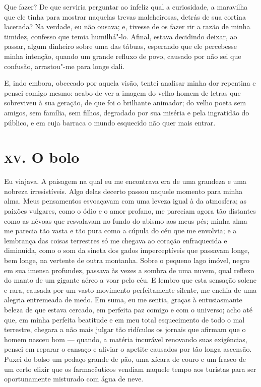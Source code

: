 Que fazer? De que serviria perguntar ao infeliz qual a curiosidade,
a maravilha que ele tinha para mostrar naquelas trevas malcheirosas,
detrás de sua cortina lacerada? Na verdade, eu não ousava; e, tivesse
de os fazer rir a razão de minha timidez, confesso que temia
humilhá"-lo. Afinal, estava decidindo deixar, ao passar, algum
dinheiro sobre uma das tábuas, esperando que ele percebesse minha
intenção, quando um grande refluxo de povo, causado por não sei que
confusão, arrastou"-me para longe dali.

E, indo embora, obcecado por aquela visão, tentei analisar minha
dor repentina e pensei comigo mesmo: acabo de ver a imagem do velho homem de
letras que sobreviveu à sua geração, de que foi o brilhante animador;
do velho poeta sem amigos, sem família, sem filhos, degradado por sua
miséria e pela ingratidão do público, e em cuja barraca o mundo esquecido
não quer mais entrar.

\chapter{\textsc{xv.} O bolo}

Eu viajava. A paisagem na qual eu me encontrava era de uma grandeza e uma
nobreza irresistíveis. Algo delas decerto passou naquele momento
para minha alma. Meus pensamentos esvoaçavam com uma leveza igual à da
atmosfera; as paixões vulgares, como o ódio e o amor profano, me
pareciam agora tão distantes como as névoas que resvalavam no fundo
do abismo aos meus pés; minha alma me parecia tão vasta e tão pura
como a cúpula do céu que me envolvia; e a lembrança das
coisas terrestres só me chegava ao coração enfraquecida e diminuída,
como o som da sineta dos gados imperceptíveis que passavam longe, bem
longe, na vertente de outra montanha. Sobre o pequeno lago imóvel,
negro em sua imensa profundez, passava às vezes a sombra de uma
nuvem, qual reflexo do manto de um gigante aéreo a voar pelo céu. E
lembro que esta sensação solene e rara, causada por um vasto movimento
perfeitamente silente, me enchia de uma alegria entremeada de medo.
Em suma, eu me sentia, graças à entusiasmante beleza de que estava
cercado, em perfeita paz comigo e com o universo; acho até que, em minha
perfeita beatitude e em meu total esquecimento de todo o mal terrestre,
chegara a não mais julgar tão ridículos os jornais que afirmam que o
homem nasceu bom --- quando, a matéria incurável renovando suas
exigências, pensei em reparar o cansaço e aliviar o apetite causados
por tão longa ascensão. Puxei do bolso um pedaço grande de pão, uma
xícara de couro e um
frasco de um certo elixir que os farmacêuticos
vendiam naquele tempo aos turistas para ser oportunamente misturado com
água de neve.

